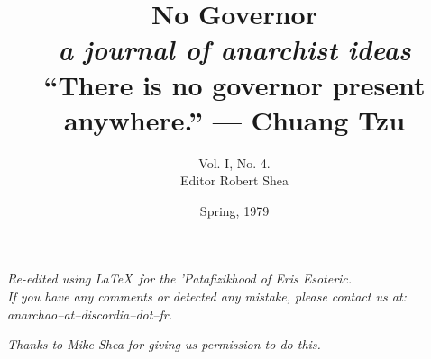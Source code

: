 \documentclass[12pt, onecolumn, letterpaper, oneside]{book}
\title{No Governor\\
		\large \textit{a journal of anarchist ideas}\\
		\vspace{2\baselineskip}
		\normalsize ``There is no governor present anywhere.'' --- Chuang Tzu
		}
\author{Vol. I, No. 4.\\Editor Robert Shea}
\date{Spring, 1979}
\begin{document}
\sloppy

\maketitle

\vspace*{\fill}

\begin{flushright}
\emph{Re-edited using \LaTeX $\,$ for the 'Patafizikhood of Eris Esoteric.\\
If you have any comments or detected any mistake, please contact us at:\\
anarchao--at--discordia--dot--fr.\\}
\end{flushright}

\begin{flushright}
\emph{Thanks to Mike Shea for giving us permission to do this.}
\end{flushright}

\vspace*{\fill}

\tableofcontents








\end{document}
